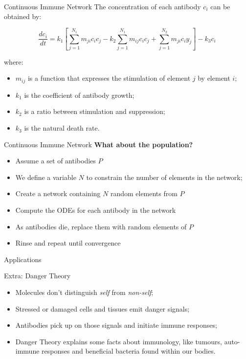 \documentclass[xcolor=svgnames]{beamer}
\begin{document}
    \begin{frame}{Continuous Immune Network}
        The concentration of each antibody $c_{i}$ can be obtained by:
        
        $$ \frac{dc_{i}}{dt} = k_{1} \left[ \sum^{N_{1}}_{j=1}{m_{ji}c_{i}c_{j}} - k_{2} \sum^{N_{1}}_{j=1}{m_{ij}c_{i}c_{j}} + \sum^{N_{2}}_{j=1}{m_{ji}c_{i}y_{j}} \right] - k_{3}c_{i} $$
        
        where:
        
        \begin{itemize}
            \item $m_{ij}$ is a function that expresses the stimulation of element $j$ by element $i$;
            \item $k_{1}$ is the coefficient of antibody growth;
            \item $k_{2}$ is a ratio between stimulation and suppression;
            \item $k_{3}$ is the natural death rate.
        \end{itemize}
    \end{frame}
    
    \begin{frame}{Continuous Immune Network}
        \textbf{What about the population?}
        \pause
        
        \vspace{1em}
        \begin{itemize}
            \item Assume a set of antibodies $P$
            \item We define a variable $N$ to constrain the number of elements in the network;
            \item Create a network containing $N$ random elements from $P$
            \item Compute the ODEs for each antibody in the network
            \item As antibodies die, replace them with random elements of $P$
            \item Rinse and repeat until convergence
        \end{itemize}
    \end{frame}
    
    \begin{frame}{Applications}
        
    \end{frame}
    
    \begin{frame}{Extra: Danger Theory}
		\begin{itemize}
		    \item Molecules don't distinguish \textit{self} from \textit{non-self};
            \item Stressed or damaged cells and tissues emit danger signals;
	        \item Antibodies pick up on those signals and initiate immune responses;
	        \item Danger Theory explains some facts about immunology, like tumours, auto-immune responses and beneficial bacteria found within our bodies.
	    \end{itemize}
	\end{frame}
	
\end{document}
